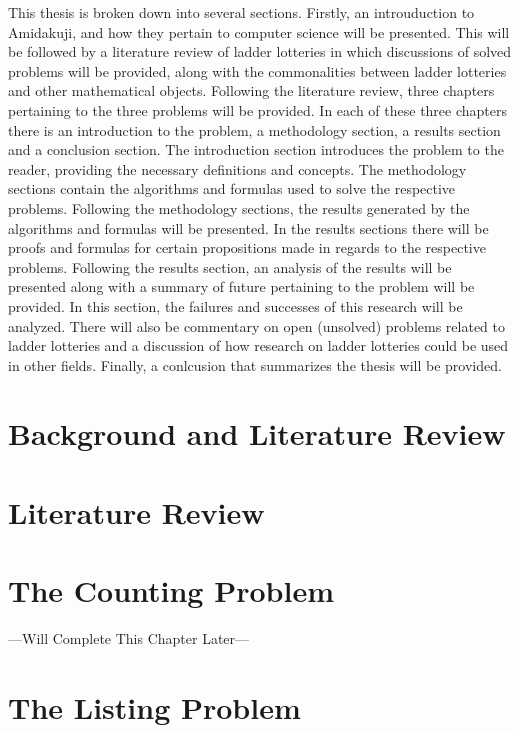This thesis is broken down into several sections. Firstly, an introuduction to Amidakuji, 
and how they pertain to computer science will be presented. This will be followed by a literature 
review of ladder lotteries in which discussions of solved problems will be 
provided, along with the commonalities between ladder lotteries and 
other mathematical objects. Following the literature review, three chapters pertaining to the three problems will be 
provided. In each of these three chapters there is an introduction to the problem, a methodology section, a results 
section and a conclusion section. The introduction section introduces the problem to the reader, providing the necessary 
definitions and concepts. The methodology sections contain the algorithms and formulas used to solve the respective problems. 
Following the methodology sections, the results generated by the algorithms and formulas will be presented.
In the results sections there will be proofs and formulas for certain propositions made in regards to the respective problems. 
Following the results section, an analysis of the results will be presented along with a summary  of future pertaining to the problem 
will be provided. In this section,
the failures and successes of this research will be analyzed. There will also be commentary on 
open (unsolved) problems related to ladder lotteries and a 
discussion of how research on ladder lotteries could be used in other fields.
Finally, a conlcusion that summarizes the thesis will be provided.

\chapter{Background and Literature Review}
\label{chapter:background}
 


\chapter{Literature Review}


\chapter{The Counting Problem}
\label{chapter:countingProblem}
---Will Complete This Chapter Later---

\chapter{The Listing Problem}  
\label{chapter:listingproblem}





